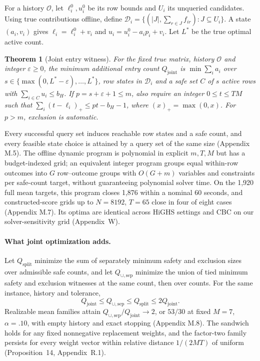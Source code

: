 \documentclass[11pt]{article}
\newtheorem{theorem}{Theorem}
\newcommand{\Qj}{Q_{\mathrm{joint}}}
\newcommand{\Qu}{Q_{\cup,\mathrm{sep}}}
\newcommand{\Qs}{Q_{\mathrm{split}}}
\newcommand{\bH}{b_H}
\begin{document}
For a history $\mathcal O$, let $\ell_i^0,u_i^0$ be its row bounds and $U_i$ its unqueried candidates. Using true contributions offline, define $\mathcal D_i=\{(|J|,\sum_{r\in J}f_{ir}):J\subseteq U_i\}$. A state $(a_i,v_i)$ gives $\ell_i=\ell_i^0+v_i$ and $u_i=u_i^0-a_ip_i+v_i$. Let $L^*$ be the true optimal active count.

\begin{theorem}[Joint entry witness]
\label{thm:joint}
For the fixed true matrix, history $\mathcal O$ and integer $\varepsilon\ge0$, the minimum additional entry count $\Qj$ is $\min\sum_ia_i$ over $s\in\{\max(0,L^*-\varepsilon),\dots,L^*\}$, row states in $\mathcal D_i$ and a safe set $C$ of $s$ active rows with $\sum_{i\in C}u_i\le\bH$. If $p=s+\varepsilon+1\le m$, also require an integer $0\le t\le TM$ such that $\sum_i(t-\ell_i)_+\le pt-\bH-1$, where $(x)_+=\max(0,x)$. For $p>m$, exclusion is automatic.
\end{theorem}
Every successful query set induces reachable row states and a safe count, and every feasible state choice is attained by a query set of the same size (Appendix M.5). The offline dynamic program is polynomial in explicit $m,T,M$ but has a budget-indexed grid; an equivalent integer program groups equal within-row outcomes into $G$ row--outcome groups with $O(G+m)$ variables and constraints per safe-count target, without guaranteeing polynomial solver time. On the 1,920 full mean targets, this program closes 1,876 within a nominal 60 seconds, and constructed-score grids up to $N=8192$, $T=65$ close in four of eight cases (Appendix M.7). Its optima are identical across HiGHS settings and CBC on our solver-sensitivity grid (Appendix~W).

\paragraph{What joint optimization adds.} Let $\Qs$ minimize the sum of separately minimum safety and exclusion sizes over admissible safe counts, and let $\Qu$ minimize the union of tied minimum safety and exclusion witnesses at the same count, then over counts. For the same instance, history and tolerance,
\begin{equation}
\Qj\le\Qu\le\Qs\le2\Qj.
\label{eq:sandwich}
\end{equation}
Realizable mean families attain $\Qu/\Qj\to2$, or $53/30$ at fixed $M=7$, $\alpha=.10$, with empty history and exact stopping (Appendix M.8). The sandwich holds for any fixed nonnegative replacement weights, and the factor-two family persists for every weight vector within relative distance $1/(2MT)$ of uniform (Proposition~14, Appendix~R.1).
\end{document}
